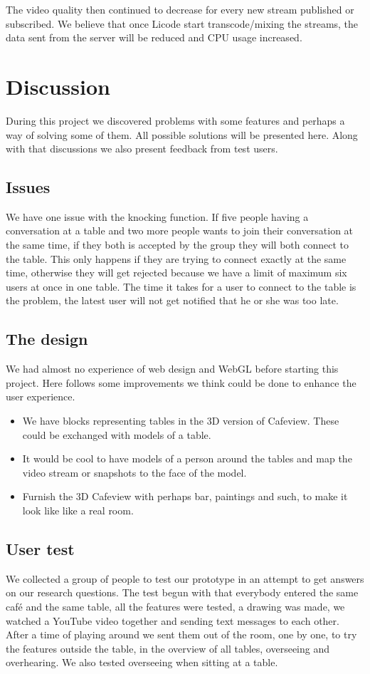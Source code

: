 \documentclass[12pt, titlepage]{article}
\begin{document}
The video quality then continued to decrease for every new stream published or subscribed. We believe that once Licode start transcode/mixing the streams, the data sent from the server will be reduced and CPU usage increased. 
\section{Discussion}
During this project we discovered problems with some features and perhaps a way of solving some of them. All possible solutions will be presented here. Along with that discussions we also present feedback from test users.
\subsection{Issues}
We have one issue with the knocking function. If five people having a conversation at a table and two more people wants to join their conversation at the same time, if they both is accepted by the group they will both connect to the table. This only happens if they are trying to connect exactly at the same time, otherwise they will get rejected because we have a limit of maximum six users at once in one table. The time it takes for a user to connect to the table is the problem, the latest user will not get notified that he or she was too late. 
\subsection{The design}
We had almost no experience of web design and WebGL before starting this project. Here follows some improvements we think could be done to enhance the user experience.
\begin{itemize}
\item We have blocks representing tables in the 3D version of Cafeview. These could be exchanged with models of a table. 
\item It would be cool to have models of a person around the tables and map the video stream or snapshots to the face of the model.
\item Furnish the 3D Cafeview with perhaps bar, paintings and such, to make it look like like a real room.
\end{itemize}
\subsection{User test}
We collected a group of people to test our prototype in an attempt to get answers on our research questions. The test begun with that everybody entered the same café and the same table, all the features were tested, a drawing was made, we watched a YouTube video together and sending text messages to each other. After a time of playing around we sent them out of the room, one by one, to try the features outside the table, in the overview of all tables, overseeing and overhearing. We also tested overseeing when sitting at a table.
\end{document}
